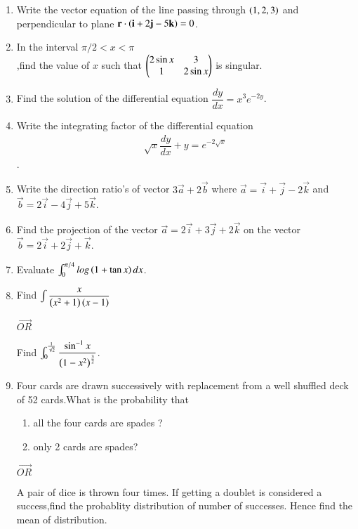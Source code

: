 \documentclass[journal,12pt,twocolumn]{IEEEtran}
\theoremstyle{remark}
\begin{document}
\begin{enumerate}
\item Write the vector equation of the line passing through $\left(1,2,3\right)$ and perpendicular to plane $\mathbf{r}\cdot\left(\mathbf{i}+2\mathbf{j}-5\mathbf{k}\right)=0$.\\

\item In the interval $\pi/2 < x < \pi$\\,find the value of $x$ such that $\begin{pmatrix}2\sin{x} & 3 \\1 & 2\sin{x}\end{pmatrix}$ is singular.\\

\item Find the solution of the differential equation $\dfrac{dy}{dx} = x^{3}e^{-2y}$.\\
\item Write the integrating factor of the differential equation 
\begin{align}
\sqrt{x}\dfrac{dy}{dx}+y = e^{-2\sqrt{x}}
\end{align}.\\

\item Write the direction ratio's of vector $3\vec{a}+2\vec{b}$ where $\vec{a} = \vec{i}+\vec{j}-2\vec{k}$ and $\vec{b}=2\vec{i}-4\vec{j}+5\vec{k}$.\\

\item Find the projection of the vector $\vec{a} = 2\vec{i}+3\vec{j}+2\vec{k}$ on the vector $\vec{b} = 2\vec{i}+2\vec{j}+\vec{k}$.\\ 

\item Evaluate $\int_{0}^{\pi/4} log\left(1+ \tan{x}\right)dx$.\\
\item Find $\int \dfrac{x}{\left(x^{2}+1\right)\left(x-1\right)}$
\begin{center} $\vec{OR}$ \\ \end{center}
Find $\int_0^{\frac{1}{\sqrt{2}}} \dfrac{\sin^{-1}{x}}{\left(1-x^{2}\right)^{\frac{3}{2}}}$.\\

\item Four cards are drawn successively with replacement from a well shuffled deck of 52 cards.What is the probability that\\
\begin{enumerate}
\item all the four cards are spades ?\\
\item only 2 cards are spades?
\end{enumerate}
\begin{center} $\vec{OR}$ \\ \end{center}
A pair of dice is thrown four times. If getting a doublet is considered a success,find the probablity distribution of number of successes. Hence find the mean of distribution.


\end{enumerate}
\end{document}
